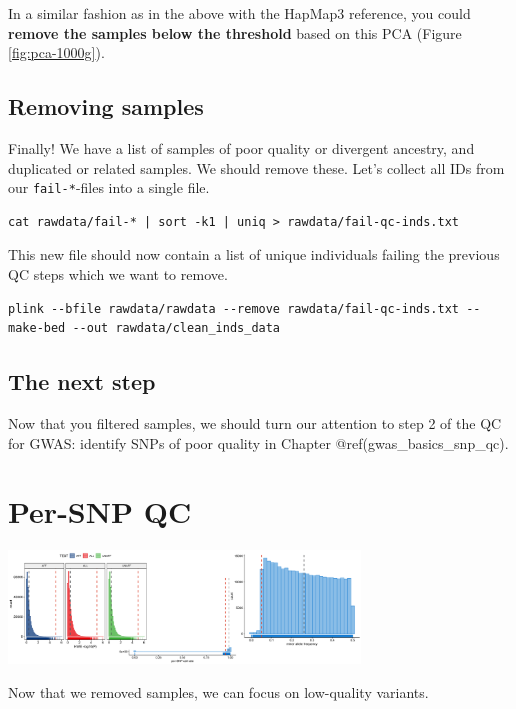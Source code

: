 \documentclass[
]{book}
\begin{document}
In a similar fashion as in the above with the HapMap3 reference, you could \textbf{remove the samples below the threshold} based on this PCA (Figure \ref{fig:pca-1000g}).

\hypertarget{removing-samples}{%
\section{Removing samples}\label{removing-samples}}

Finally! We have a list of samples of poor quality or divergent ancestry, and duplicated or related samples. We should remove these. Let's collect all IDs from our \texttt{fail-*}-files into a single file.

\begin{verbatim}
cat rawdata/fail-* | sort -k1 | uniq > rawdata/fail-qc-inds.txt
\end{verbatim}

This new file should now contain a list of unique individuals failing the previous QC steps which we want to remove.

\begin{verbatim}
plink --bfile rawdata/rawdata --remove rawdata/fail-qc-inds.txt --make-bed --out rawdata/clean_inds_data
\end{verbatim}

\hypertarget{the-next-step}{%
\section{The next step}\label{the-next-step}}

Now that you filtered samples, we should turn our attention to step 2 of the QC for GWAS: identify SNPs of poor quality in Chapter @ref(gwas\_basics\_snp\_qc).

\hypertarget{gwas_basics_snp_qc}{%
\chapter{Per-SNP QC}\label{gwas_basics_snp_qc}}

\includegraphics[width=0.7\textwidth,height=\textheight]{img/gwas_snp_qc.png}

Now that we removed samples, we can focus on low-quality variants.
\end{document}
